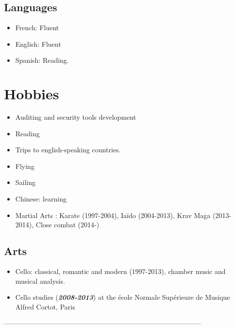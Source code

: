 \documentclass[a4paper, oneside, final]{scrartcl} %
\begin{document}
\begin{center}
\subsection*{Languages}
\begin{itemize}
    \item French: Fluent
	\item English: Fluent
	\item Spanish: Reading.
\end{itemize}
\section*{Hobbies}
\begin{itemize}
\item Auditing and security tools development
\item Reading
\item Trips to english-speaking countries.
\item Flying
\item Sailing
\item Chinese: learning
\item Martial Arts : Karate (1997-2004), Iaïdo (2004-2013), Krav Maga (2013-2014), Close combat (2014-\the\year)
\end{itemize}
\subsection*{Arts}
\begin{itemize}
\item Cello: classical, romantic and modern (1997-2013), chamber music and musical analysis.
\item Cello studies (\textbf{\textit{2008-2013}}) at the école Normale Supérieure de Musique Alfred Cortot, Paris\\
\end{itemize}

---------------------------------------------------------------------------------------

\end{center}
\end{document}
